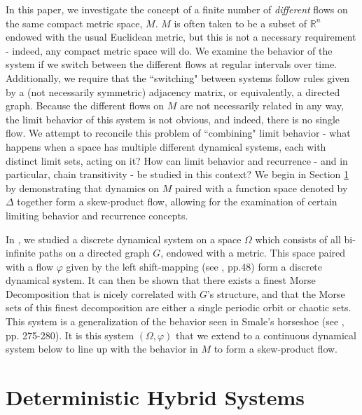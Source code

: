 \documentclass[11pt]{article}
\begin{document}
\indent In this paper, we investigate the concept of a finite number of \emph{different} flows on the same compact metric space, $M$.  $M$ is often taken to be a subset of $\mathbb{R}^n$ endowed with the usual Euclidean metric, but this is not a necessary requirement - indeed, any compact metric space will do.  We examine the behavior of the system if we switch between the different flows at regular intervals over time.  Additionally, we require that the ``switching" between systems follow rules given by a (not necessarily symmetric) adjacency matrix, or equivalently, a directed graph.  Because the different flows on $M$ are not necessarily related in any way, the limit behavior of this system is not obvious, and indeed, there is no single flow.  We attempt to reconcile this problem of ``combining" limit behavior - what happens when a space has multiple different dynamical systems, each with distinct limit sets, acting on it?  How can limit behavior and recurrence - and in particular, chain transitivity - be studied in this context? We begin in Section \ref{DHS} by demonstrating that dynamics on $M$ paired with a function space denoted by $\Delta$ together form a skew-product flow, allowing for the examination of certain limiting behavior and recurrence concepts. 

\indent In \cite{discretesystems}, we studied a discrete dynamical system on a space $\Omega$ which consists of all bi-infinite paths on a directed graph $G$, endowed with a metric.   This space paired with a flow $\varphi$ given by the left shift-mapping (see \cite{Katok}, pp.48) form a discrete dynamical system.  It can then be shown that there exists a finest Morse Decomposition that is nicely correlated with $G$'s structure, and that the Morse sets of this finest decomposition are either a single periodic orbit or chaotic sets.  This system is a generalization of the behavior seen in Smale's horseshoe (see 
\cite{Robinson}, pp. 275-280).  It is this system $(\Omega, \varphi)$ that we extend to a continuous dynamical system below to line up with the behavior in $M$ to form a skew-product flow.\\


\section{Deterministic Hybrid Systems}\label{DHS}
\end{document}
